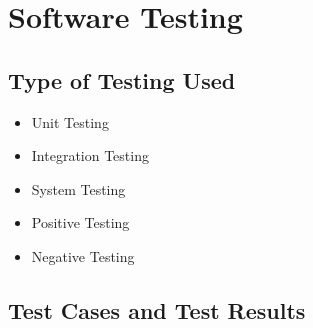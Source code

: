 \documentclass[12pt,a4paper,final]{report}
\begin{document}
\chapter{Software Testing}
\thispagestyle{empty}
\newpage


\section{Type of Testing Used}
\begin{itemize}
\item Unit Testing
\item Integration Testing
\item System Testing
\item Positive Testing
\item Negative Testing
\end{itemize}


\section{Test Cases and Test Results}
\end{document}
